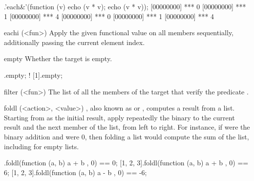\begin{urbiscriptapi}
\begin{urbiscript}
[0, 1, 2].'each&'(function (v) {echo (v * v); echo (v * v)});
[00000000] *** 0
[00000000] *** 1
[00000000] *** 4
[00000000] *** 0
[00000000] *** 1
[00000000] *** 4
\end{urbiscript}


\item[eachi](<fun>)%
  Apply the given functional value  on all members
  sequentially, additionally passing the current element index.



\item[empty]
  Whether the target is empty.

\begin{urbiassert}
   [].empty;
! [1].empty;
\end{urbiassert}


\item[filter](<fun>)%
  The list of all the members of the target that verify the predicate
  .



\item[foldl](<action>, <value>)%
  ,
  also known as  or , computes a result
  from a list.  Starting from  as the initial result, apply
  repeatedly the binary  to the current result and the
  next member of the list, from left to right.  For instance, if
   were the binary addition and  were 0, then
  folding a list would compute the sum of the list, including for
  empty lists.

\begin{urbiassert}
       [].foldl(function (a, b) { a + b }, 0) == 0;
[1, 2, 3].foldl(function (a, b) { a + b }, 0) == 6;
[1, 2, 3].foldl(function (a, b) { a - b }, 0) == -6;
\end{urbiassert}



\end{urbiscriptapi}
